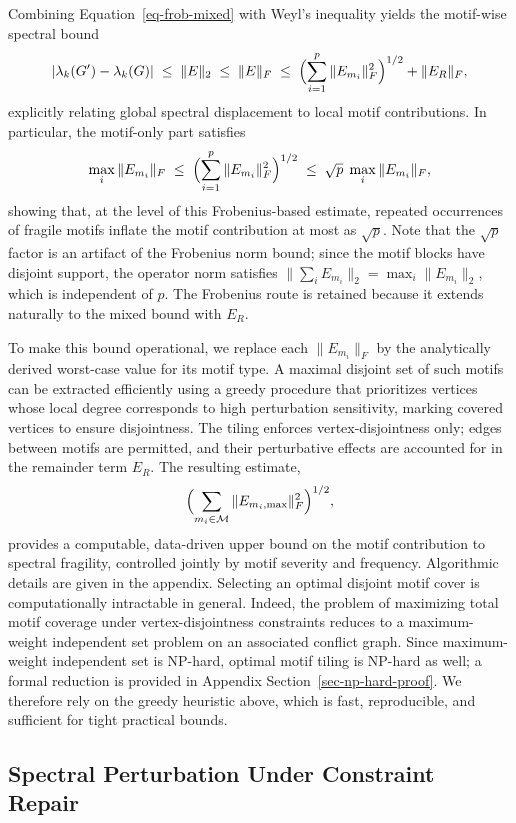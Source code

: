 \documentclass[
  11pt,
  letterpaper]{siamart251216}
\begin{document}
Combining Equation~\ref{eq-frob-mixed} with Weyl's inequality yields the
motif-wise spectral bound \[
|\lambda_k(G')-\lambda_k(G)|
\;\le\; \|E\|_2
\;\le\; \|E\|_F
\;\le\; \Bigl(\sum_{i=1}^{p} \|E_{m_i}\|_F^2\Bigr)^{1/2} + \|E_R\|_F,
\] explicitly relating global spectral displacement to local motif
contributions. In particular, the motif-only part satisfies \[
\max_{i}\|E_{m_i}\|_F
\;\le\; \Bigl(\sum_{i=1}^{p} \|E_{m_i}\|_F^2\Bigr)^{1/2}
\;\le\; \sqrt{p}\;\max_{i}\|E_{m_i}\|_F,
\] showing that, at the level of this Frobenius-based estimate, repeated
occurrences of fragile motifs inflate the motif contribution at most as
\(\sqrt{p}\). Note that the \(\sqrt{p}\) factor is an artifact of the
Frobenius norm bound; since the motif blocks have disjoint support, the
operator norm satisfies \(\|\sum_i E_{m_i}\|_2 = \max_i \|E_{m_i}\|_2\),
which is independent of \(p\). The Frobenius route is retained because
it extends naturally to the mixed bound with \(E_R\).

To make this bound operational, we replace each \(\|E_{m_i}\|_F\) by the
analytically derived worst-case value for its motif type. A maximal
disjoint set of such motifs can be extracted efficiently using a greedy
procedure that prioritizes vertices whose local degree corresponds to
high perturbation sensitivity, marking covered vertices to ensure
disjointness. The tiling enforces vertex-disjointness only; edges
between motifs are permitted, and their perturbative effects are
accounted for in the remainder term \(E_R\). The resulting estimate, \[
\Bigl(\sum_{m_i\in\mathcal{M}} \|E_{m_i,\max}\|_F^2\Bigr)^{1/2},
\] provides a computable, data-driven upper bound on the motif
contribution to spectral fragility, controlled jointly by motif severity
and frequency. Algorithmic details are given in the appendix. Selecting
an optimal disjoint motif cover is computationally intractable in
general. Indeed, the problem of maximizing total motif coverage under
vertex-disjointness constraints reduces to a maximum-weight independent
set problem on an associated conflict graph. Since maximum-weight
independent set is NP-hard, optimal motif tiling is NP-hard as well; a
formal reduction is provided in Appendix
Section~\ref{sec-np-hard-proof}. We therefore rely on the greedy
heuristic above, which is fast, reproducible, and sufficient for tight
practical bounds.

\subsection{Spectral Perturbation Under Constraint
Repair}\label{sec-repair-perturbation}
\end{document}
